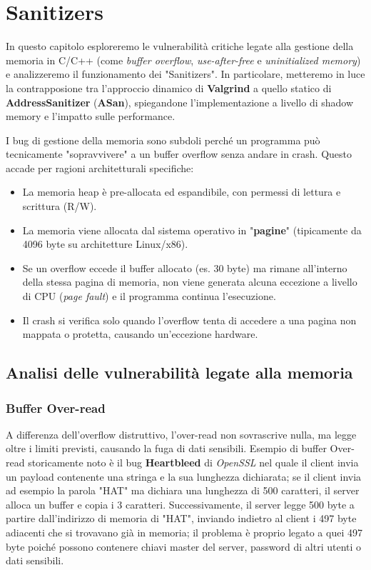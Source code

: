 \chapter{Sanitizers}
In questo capitolo esploreremo le vulnerabilità critiche legate alla gestione 
della memoria in C/C++ (come \textit{buffer overflow}, \textit{use-after-free} e \textit{uninitialized 
memory}) e analizzeremo il funzionamento dei "Sanitizers". In 
particolare, metteremo in luce la contrapposione tra l'approccio dinamico di \textbf{Valgrind} a quello statico 
di \textbf{AddressSanitizer} (\textbf{ASan}), spiegandone l'implementazione a livello di 
shadow memory e l'impatto sulle performance.

I bug di gestione della memoria sono subdoli perché un programma può 
tecnicamente "sopravvivere" a un buffer overflow senza andare in crash.
Questo accade per ragioni architetturali specifiche:

\begin{itemize}
    \item La memoria heap è pre-allocata ed espandibile, con permessi di lettura e scrittura (R/W).
    \item La memoria viene allocata dal sistema operativo in "\textbf{pagine}" (tipicamente da 4096 byte su architetture Linux/x86).
    \item Se un overflow eccede il buffer allocato (es. 30 byte) ma rimane 
    all'interno della stessa pagina di memoria, non viene generata alcuna 
    eccezione a livello di CPU (\textit{page fault}) e il programma continua 
    l'esecuzione.
    \item Il crash si verifica solo quando l'overflow tenta di accedere a una pagina non mappata o protetta, causando un'eccezione hardware.
\end{itemize}

\section{Analisi delle vulnerabilità legate alla memoria}

\subsection{Buffer Over-read}

A differenza dell'overflow distruttivo, l'over-read non sovrascrive nulla, 
ma legge oltre i limiti previsti, causando la fuga di dati sensibili.
Esempio di buffer Over-read storicamente noto è il bug \textbf{Heartbleed} di 
\textit{OpenSSL} nel quale il client invia un payload contenente una stringa
e la sua lunghezza dichiarata; se il client invia ad esempio la parola "HAT" 
ma dichiara una lunghezza di 500 caratteri, il server alloca un buffer e 
copia i 3 caratteri. Successivamente, il server legge 500 byte a partire 
dall'indirizzo di memoria di "HAT", inviando indietro al client i 497 byte 
adiacenti che si trovavano già in memoria; il problema è proprio legato a quei
497 byte poiché possono contenere chiavi master del server, password di altri 
utenti o dati sensibili.

